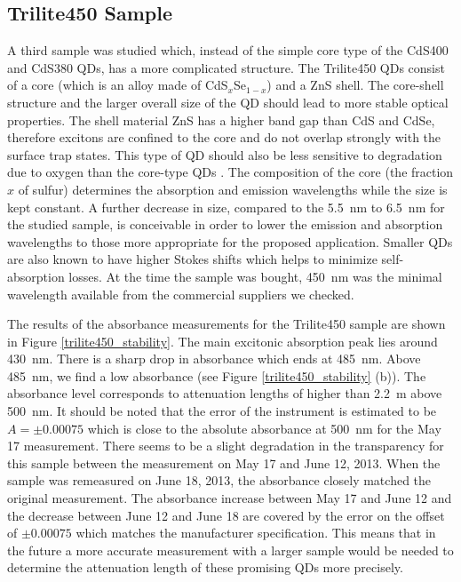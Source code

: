 \documentclass[cits]{JINST}
\begin{document}
\subsection{Trilite450 Sample}
A third sample was studied which, instead of the simple core type of the CdS400 and CdS380 QDs, has a more complicated structure. The Trilite450 QDs consist of a core (which is an alloy made of CdS$_x$Se$_{1-x}$) and a ZnS shell. The core-shell structure and the larger overall size of the QD should lead to more stable optical properties. The shell material ZnS has a higher band gap than CdS and CdSe, therefore excitons are confined to the core and do not overlap strongly with the surface trap states\cite{dabbousi1997}. This type of QD should also be less sensitive to degradation due to oxygen than the core-type QDs \cite{vanSark}. The composition of the core (the fraction $x$ of sulfur) determines the absorption and emission wavelengths while the size is kept constant. A further decrease in size, compared to the 5.5~nm to 6.5~nm for the studied sample, is conceivable in order to lower the emission and absorption wavelengths to those more appropriate for the proposed application. Smaller QDs are also known to have higher Stokes shifts \cite{swafford2006,capek,kuno1997} which helps to minimize self-absorption losses. At the time the sample was bought, 450~nm was the minimal wavelength available from the commercial suppliers we checked.

The results of the absorbance measurements for the Trilite450 sample are shown in Figure \ref{trilite450_stability}. The main excitonic absorption peak lies around 430~nm. There is a sharp drop in absorbance which ends at 485~nm. Above 485~nm, we find a low absorbance (see Figure \ref{trilite450_stability} (b)). The absorbance level corresponds to attenuation lengths of higher than 2.2~m above 500~nm. It should be noted that the error of the instrument is estimated to be $A = \pm 0.00075$ which is close to the absolute absorbance at 500~nm for the May 17 measurement. There seems to be a slight degradation in the transparency for this sample between the measurement on May 17 and June 12, 2013. When the sample was remeasured on June 18, 2013, the absorbance closely matched the original measurement. The absorbance increase between May 17 and June 12 and the decrease between June 12 and June 18 are covered by the error on the offset of $\pm 0.00075$ which matches the manufacturer specification. This means that in the future a more accurate measurement with a larger sample would be needed to determine the attenuation length of these promising QDs more precisely.
    
\end{document}
